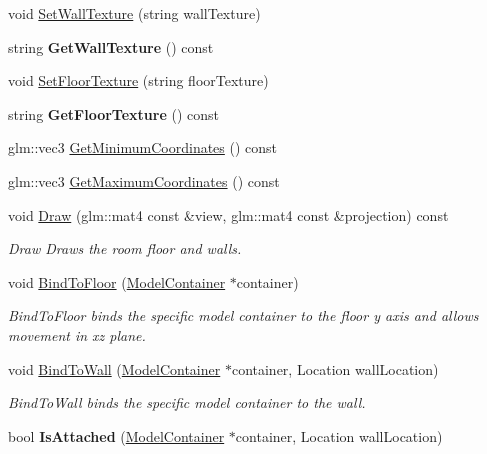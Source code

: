 \begin{DoxyCompactItemize}
\item 
void \hyperlink{class_room_ab0f733f37df1351b30573dcc8e13a18d}{Set\+Wall\+Texture} (string wall\+Texture)
\item 
\hypertarget{class_room_a9767bef2a8361a6654d77d522bee77e7}{}string {\bfseries Get\+Wall\+Texture} () const \label{class_room_a9767bef2a8361a6654d77d522bee77e7}

\item 
void \hyperlink{class_room_af6104c7b967af777bc8b054179f43829}{Set\+Floor\+Texture} (string floor\+Texture)
\item 
\hypertarget{class_room_a604d2069548456e15fc537b56900a4e0}{}string {\bfseries Get\+Floor\+Texture} () const \label{class_room_a604d2069548456e15fc537b56900a4e0}

\item 
glm\+::vec3 \hyperlink{class_room_a2a11f153f356dca23b40cd8147150cb9}{Get\+Minimum\+Coordinates} () const 
\item 
glm\+::vec3 \hyperlink{class_room_a1303223ef4eb22b9580148204f1de346}{Get\+Maximum\+Coordinates} () const 
\item 
void \hyperlink{class_room_a013a7a067df01681afa7b8bfda69e48e}{Draw} (glm\+::mat4 const \&view, glm\+::mat4 const \&projection) const 
\begin{DoxyCompactList}\small\item\em Draw Draws the room floor and walls. \end{DoxyCompactList}\item 
void \hyperlink{class_room_afc80f1892eaa6db27ac526b4ec77d8bd}{Bind\+To\+Floor} (\hyperlink{class_model_container}{Model\+Container} $\ast$container)
\begin{DoxyCompactList}\small\item\em Bind\+To\+Floor binds the specific model container to the floor y axis and allows movement in xz plane. \end{DoxyCompactList}\item 
void \hyperlink{class_room_a7c26d8c17540d6cd47a649e55de32d2e}{Bind\+To\+Wall} (\hyperlink{class_model_container}{Model\+Container} $\ast$container, Location wall\+Location)
\begin{DoxyCompactList}\small\item\em Bind\+To\+Wall binds the specific model container to the wall. \end{DoxyCompactList}\item 
\hypertarget{class_room_a7c8fbf9ae9469a79ff1b5e6cfaf4cb9d}{}bool {\bfseries Is\+Attached} (\hyperlink{class_model_container}{Model\+Container} $\ast$container, Location wall\+Location)\label{class_room_a7c8fbf9ae9469a79ff1b5e6cfaf4cb9d}

\end{DoxyCompactItemize}


